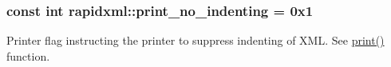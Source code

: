 \subsubsection[{print\+\_\+no\+\_\+indenting}]{\setlength{\rightskip}{0pt plus 5cm}const int rapidxml\+::print\+\_\+no\+\_\+indenting = 0x1}\label{namespacerapidxml_a65477b812a80f5bda693ec57e57de064}


Printer flag instructing the printer to suppress indenting of X\+M\+L. See \hyperlink{namespacerapidxml_a0fb0be6eba49fb2e2646d5a72a0dc355}{print()} function. 

